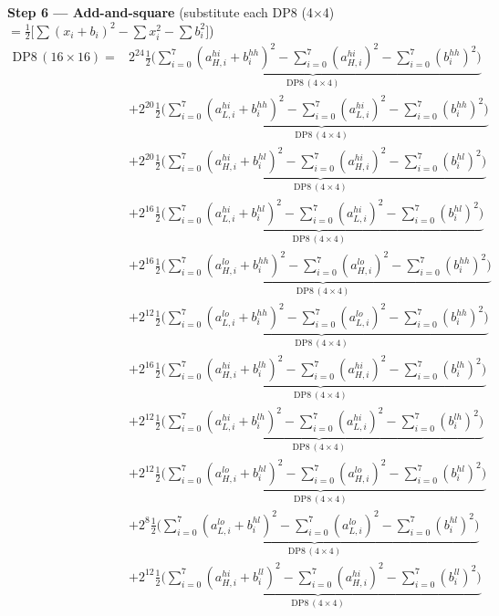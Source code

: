 \documentclass[fleqn]{article}
\newcommand{\DPop}[3]{\mathrm{DP#1}\,(#2\!\times\!#3)}
\begin{document}
\textbf{Step 6 --- Add-and-square}\quad
{\small(substitute each DP8 (4$\times$4) $= \tfrac{1}{2}\big[\sum(x_i{+}b_i)^2 - \sum x_i^2 - \sum b_i^2\big]$)}
\begin{align*}
\DPop{8}{16}{16} = {}
  & 2^{24}\underbrace{\tfrac{1}{2}\Big(\sum_{i=0}^{7}(a_{H,i}^{hi}{+}b_i^{hh})^2 - \sum_{i=0}^{7}(a_{H,i}^{hi})^2 - \sum_{i=0}^{7}(b_i^{hh})^2\Big)}_{\DPop{8}{4}{4}} \\[0.7em]
  & + 2^{20}\underbrace{\tfrac{1}{2}\Big(\sum_{i=0}^{7}(a_{L,i}^{hi}{+}b_i^{hh})^2 - \sum_{i=0}^{7}(a_{L,i}^{hi})^2 - \sum_{i=0}^{7}(b_i^{hh})^2\Big)}_{\DPop{8}{4}{4}} \\[0.7em]
  & + 2^{20}\underbrace{\tfrac{1}{2}\Big(\sum_{i=0}^{7}(a_{H,i}^{hi}{+}b_i^{hl})^2 - \sum_{i=0}^{7}(a_{H,i}^{hi})^2 - \sum_{i=0}^{7}(b_i^{hl})^2\Big)}_{\DPop{8}{4}{4}} \\[0.7em]
  & + 2^{16}\underbrace{\tfrac{1}{2}\Big(\sum_{i=0}^{7}(a_{L,i}^{hi}{+}b_i^{hl})^2 - \sum_{i=0}^{7}(a_{L,i}^{hi})^2 - \sum_{i=0}^{7}(b_i^{hl})^2\Big)}_{\DPop{8}{4}{4}} \\[0.7em]
  & + 2^{16}\underbrace{\tfrac{1}{2}\Big(\sum_{i=0}^{7}(a_{H,i}^{lo}{+}b_i^{hh})^2 - \sum_{i=0}^{7}(a_{H,i}^{lo})^2 - \sum_{i=0}^{7}(b_i^{hh})^2\Big)}_{\DPop{8}{4}{4}} \\[0.7em]
  & + 2^{12}\underbrace{\tfrac{1}{2}\Big(\sum_{i=0}^{7}(a_{L,i}^{lo}{+}b_i^{hh})^2 - \sum_{i=0}^{7}(a_{L,i}^{lo})^2 - \sum_{i=0}^{7}(b_i^{hh})^2\Big)}_{\DPop{8}{4}{4}} \\[0.7em]
  & + 2^{16}\underbrace{\tfrac{1}{2}\Big(\sum_{i=0}^{7}(a_{H,i}^{hi}{+}b_i^{lh})^2 - \sum_{i=0}^{7}(a_{H,i}^{hi})^2 - \sum_{i=0}^{7}(b_i^{lh})^2\Big)}_{\DPop{8}{4}{4}} \\[0.7em]
  & + 2^{12}\underbrace{\tfrac{1}{2}\Big(\sum_{i=0}^{7}(a_{L,i}^{hi}{+}b_i^{lh})^2 - \sum_{i=0}^{7}(a_{L,i}^{hi})^2 - \sum_{i=0}^{7}(b_i^{lh})^2\Big)}_{\DPop{8}{4}{4}} \\[0.7em]
  & + 2^{12}\underbrace{\tfrac{1}{2}\Big(\sum_{i=0}^{7}(a_{H,i}^{lo}{+}b_i^{hl})^2 - \sum_{i=0}^{7}(a_{H,i}^{lo})^2 - \sum_{i=0}^{7}(b_i^{hl})^2\Big)}_{\DPop{8}{4}{4}} \\[0.7em]
  & + 2^{8}\underbrace{\tfrac{1}{2}\Big(\sum_{i=0}^{7}(a_{L,i}^{lo}{+}b_i^{hl})^2 - \sum_{i=0}^{7}(a_{L,i}^{lo})^2 - \sum_{i=0}^{7}(b_i^{hl})^2\Big)}_{\DPop{8}{4}{4}} \\[0.7em]
  & + 2^{12}\underbrace{\tfrac{1}{2}\Big(\sum_{i=0}^{7}(a_{H,i}^{hi}{+}b_i^{ll})^2 - \sum_{i=0}^{7}(a_{H,i}^{hi})^2 - \sum_{i=0}^{7}(b_i^{ll})^2\Big)}_{\DPop{8}{4}{4}} \\[0.7em]

\end{align*}
\end{document}
